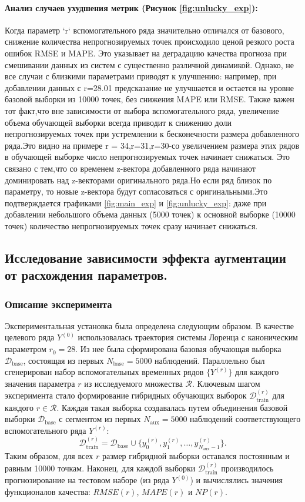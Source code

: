 \documentclass[a4paper,12pt]{extarticle}
\begin{document}
\paragraph{Анализ случаев ухудшения метрик (Рисунок \ref{fig:unlucky_exp}):}
 Когда параметр `r` вспомогательного ряда значительно отличался от базового,
  снижение количества непрогнозируемых точек происходило ценой резкого роста
   ошибок RMSE и MAPE. Это указывает на деградацию качества прогноза при
   смешивании данных из систем с существенно различной динамикой. Однако,
    не все случаи с близкими параметрами приводят к улучшению:
    например, при добавлении данных с r=28.01 предсказание не улучшается
     и остается на уровне базовой выборки из 10000 точек, без снижения MAPE или RMSE.
Также важен тот факт,что вне зависимости от выбора вспомогательного ряда,
  увеличение объема обучающей выборки всегда приводит к снижению доли
   непрогнозируемых точек при устремлении к бесконечности размера добавленного ряда.Это видно на примере 
   r = 34,r=31,r=30-со увеличением размера этих рядов в обучающей выборке
    число непрогнозируемых точек начинает снижаться.
     Это связано с тем,что со временем z-вектора добавленного ряда начинают 
   доминировать над z-векторами оригинального ряда.Но если  ряд близок по параметру,
    то новые z-вектора будут согласоваться
    с оригинальными.Это подтверждается графиками \ref{fig:main_exp} и \ref{fig:unlucky_exp}: 
    даже при добавлении небольшого объема данных (5000 точек) к основной выборке (10000 точек) 
    количество непрогнозируемых точек сразу начинает снижаться.

\subsection{Исследование зависимости эффекта аугментации от расхождения параметров.}
\subsubsection{Описание эксперимента}
Экспериментальная установка была определена следующим образом. В
 качестве целевого ряда $Y^{(0)}$ использовалась траектория системы Лоренца с каноническим параметром 
 $r_0=28$. Из нее была сформирована базовая обучающая выборка $\mathcal{D}_{\text{base}}$, состоящая
  из первых $N_{\text{base}} = 5000$ наблюдений. Параллельно был сгенерирован набор вспомогательных временных
   рядов $\{Y^{(r)}\}$ для каждого значения параметра $r$ из исследуемого множества $\mathcal{R}$.
Ключевым шагом эксперимента стало формирование гибридных обучающих выборок $\mathcal{D}_{\text{train}}^{(r)}$ 
для каждого $r \in \mathcal{R}$. Каждая такая выборка создавалась путем объединения базовой выборки $\mathcal{D}_{\text{base}}$
 с сегментом из первых $N_{\text{aux}} = 5000$ наблюдений соответствующего вспомогательного ряда $Y^{(r)}$:
\[
\mathcal{D}_{\text{train}}^{(r)} = \mathcal{D}_{\text{base}} \cup \{y_0^{(r)}, y_1^{(r)}, \dots, y_{N_{\text{aux}}-1}^{(r)}\}.
\]
Таким образом, для всех $r$ размер гибридной выборки оставался постоянным и равным 10000 точкам.
 Наконец, для каждой выборки $\mathcal{D}_{\text{train}}^{(r)}$ производилось прогнозирование на
  тестовом наборе (из ряда $Y^{(0)}$) и вычислялись значения функционалов качества: $RMSE(r)$, $MAPE(r)$ и $NP(r)$.
\end{document}
